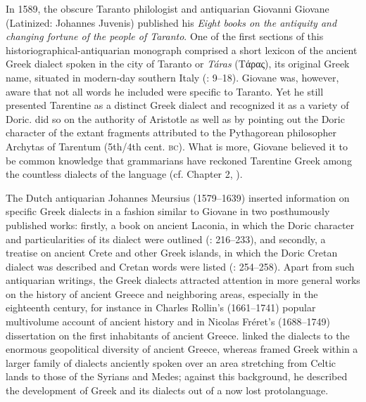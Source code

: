 In 1589, the obscure Taranto philologist and antiquarian Giovanni Giovane (Latinized: Johannes Juvenis) published his \textit{Eight books on the antiquity and changing fortune of the people of Taranto}. One of the first sections of this historiographical-antiquarian monograph comprised a short lexicon of the ancient Greek dialect spoken in the city of Taranto or \textit{Táras} (Tάρας), its original Greek name, situated in modern-day southern Italy (\citealt{Giovane1589}: 9–18). Giovane was, however, aware that not all words he included were specific to Taranto. Yet he still presented Tarentine as a distinct Greek dialect and recognized it as a variety of Doric. \citet[8--9]{Giovane1589} did so on the authority of Aristotle as well as by pointing out the Doric character of the extant fragments attributed to the Pythagorean philosopher Archytas of Tarentum (5th/4th cent. \textsc{bc}). What is more, Giovane believed it to be common knowledge that grammarians have reckoned Tarentine Greek among the countless dialects of the language (cf. Chapter 2, ).

The Dutch antiquarian Johannes Meursius (1579–1639) inserted information on specific Greek dialects in a fashion similar to Giovane in two posthumously published works: firstly, a book on ancient Laconia, in which the Doric character and particularities of its dialect were outlined (\citealt{Meursius1661}: 216–233), and secondly, a treatise on ancient Crete and other Greek islands, in which the Doric Cretan dialect was described and Cretan words were listed (\citealt{Meursius1675}: 254–258). Apart from such antiquarian writings, the Greek dialects attracted attention in more general works on the history of ancient Greece and neighboring areas, especially in the eighteenth century, for instance in Charles Rollin’s (1661–1741) popular multivolume account of ancient history and in Nicolas Fréret’s (1688–1749) dissertation on the first inhabitants of ancient Greece. \citet[395--396]{Rollin1731} linked the dialects to the enormous geopolitical diversity of ancient Greece, whereas \citet[esp. 107--129]{Freret1809} framed Greek within a larger family of dialects anciently spoken over an area stretching from Celtic lands to those of the Syrians and Medes; against this background, he described the development of Greek and its dialects out of a now lost protolanguage.

